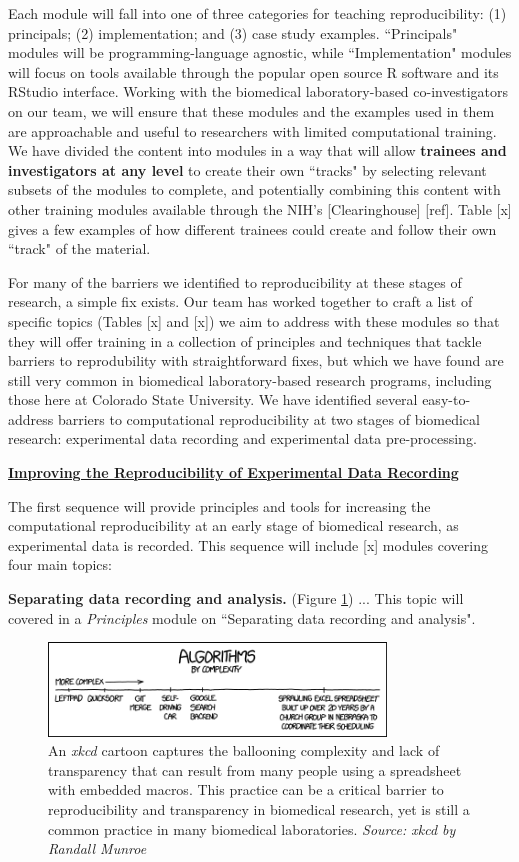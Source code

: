 \documentclass[pdftex,english,11pt,parskip=half]{scrartcl}
\begin{document}
Each module will fall into one of three categories for teaching reproducibility: (1) principals; (2) implementation; and (3) case study examples. ``Principals" modules will be programming-language agnostic, while ``Implementation" modules will focus on tools available through the popular open source R software and its RStudio interface. Working with the biomedical laboratory-based co-investigators on our team, we will ensure that these modules and the examples used in them are approachable and useful to researchers with limited computational training. We have divided the content into modules in a way that will allow \textbf{trainees and investigators at any level} to create their own ``tracks" by selecting relevant subsets of the modules to complete, and potentially combining this content with other training modules available through the NIH's [Clearinghouse] [ref]. Table [x] gives a few examples of how different trainees could create and follow their own ``track" of the material.

For many of the barriers we identified to reproducibility at these stages of research, a simple fix exists. Our team has worked together to craft a list of specific topics (Tables [x] and [x]) we aim to address with these modules so that they will offer training in a collection of principles and techniques that tackle barriers to reprodubility with straightforward fixes, but which we have found are still very common in biomedical laboratory-based research programs, including those here at Colorado State University. We have identified several easy-to-address barriers to computational reproducibility at two stages of biomedical research: experimental data recording and experimental data pre-processing.  

\underline{\textbf{Improving the Reproducibility of Experimental Data Recording}} 

The first sequence will provide principles and tools for increasing the computational reproducibility at an early stage of biomedical research, as experimental data is recorded. This sequence will include [x] modules covering four main topics: 

\textbf{Separating data recording and analysis.} (Figure \ref{fig:spreadsheet}) ... This topic will covered in a \textit{Principles} module on ``Separating data recording and analysis".

\begin{figure}[b]
\centering
\includegraphics[width = 0.8\textwidth]{figures/algorithms.png}
\caption{An \textit{xkcd} cartoon captures the ballooning complexity and lack of transparency that can result from many people using a spreadsheet with embedded macros. This practice can be a critical barrier to reproducibility and transparency in biomedical research, yet is still a common practice in many biomedical laboratories. \textit{Source: xkcd by Randall Munroe}}
\label{fig:spreadsheet}
\end{figure}
\end{document}
